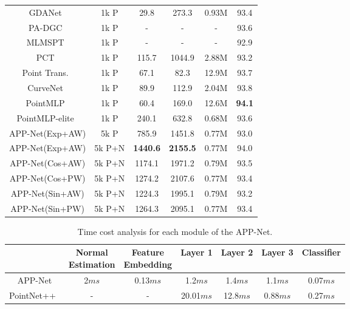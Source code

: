 \documentclass[journal]{IEEEtran}
\begin{document}
\begin{table*}[t]
\begin{center}
\begin{tabular}{c|c|c|c|c|c}
GDANet~\cite{xu2021learning}& 1k P&29.8&273.3&0.93M&93.4\\
PA-DGC~\cite{xu2021paconv}&1k P&-&-&-&93.6\\
MLMSPT~\cite{han2021point}&1k P&-&-&-&92.9\\
PCT~\cite{guo2021pct}&1k P&115.7&1044.9&2.88M&93.2\\
Point Trans.~\cite{zhao2021point}&1k P&67.1&82.3&12.9M&93.7\\
CurveNet~\cite{muzahid2020curvenet}&1k P&89.9&112.9&2.04M&{93.8}\\
PointMLP~\cite{ma2022rethinking}&1k P&60.4&169.0&12.6M&{\bf94.1}\\
PointMLP-elite~\cite{ma2022rethinking}&1k P&240.1&632.8&{0.68M}&93.6\\ \hline
APP-Net(Exp+AW)& 5k P&{785.9}&{1451.8}&0.77M&93.0\\ \hline
APP-Net(Exp+AW) & 5k P+N&{\bf1440.6}&{\bf 2155.5}&{0.77M}& 94.0    \\
APP-Net(Cos+AW) & 5k P+N&1174.1&1971.2&0.79M& 93.5    \\
APP-Net(Cos+PW) & 5k P+N&1274.2&2107.6&0.77M& 93.4    \\
APP-Net(Sin+AW) & 5k P+N&1224.3&1995.1&0.79M& 93.2    \\
APP-Net(Sin+PW) & 5k P+N&1264.3&2095.1&0.77M& 93.4    \\ 
\hline

\end{tabular}
\end{center}
\end{table*}

\begin{table*}[t]
	\caption{Time cost analysis for each module of the APP-Net.}\label{tab:timeanalysis}
\begin{center}
\begin{tabular}{c|c|c|c|c|c|c}
\hline
     & \makecell[c]{Normal\\ Estimation}&\makecell[c] {Feature \\ Embedding} & Layer 1 & Layer 2 & Layer 3 & Classifier \\ \hline
APP-Net   & 2$ms$     & 0.13$ms$              &     1.2$ms$                       & 1.4$ms$             & 1.1$ms$   & 0.07$ms$    \\ \hline
PointNet++~\cite{PointNet++}&-&-&20.01$ms$&12.8$ms$&0.88$ms$&0.27$ms$\\
\hline
\end{tabular}
\end{center}
\end{table*}
               
\end{document}
